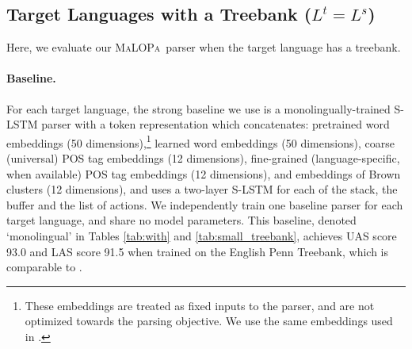 \documentclass[11pt]{article}
\newcommand{\malopa}{\textsc{MaLOPa}}
\begin{document}
\subsection{Target Languages with a Treebank ($L^t = L^s$)}
\label{sec:with}
Here, we evaluate our \malopa~parser when the target language has a treebank.

\paragraph{Baseline.} For each target language, the strong baseline we use is a monolingually-trained S-LSTM parser with a token representation which concatenates: pretrained word embeddings (50 dimensions),\footnote{These embeddings are treated as fixed inputs to the parser, and are not optimized towards the parsing objective. We use the same embeddings used in .} learned word embeddings (50 dimensions), coarse (universal) POS tag embeddings (12 dimensions), fine-grained (language-specific, when available) POS tag embeddings (12 dimensions), and embeddings of Brown clusters (12 dimensions), and uses a two-layer S-LSTM for each of the stack, the buffer and the list of actions.
We independently train one baseline parser for each target language, and share no model parameters.
This baseline, denoted `monolingual' in Tables \ref{tab:with} and \ref{tab:small_treebank}, achieves UAS score 93.0 and LAS score 91.5 when trained on the English Penn Treebank, which is comparable to .
\end{document}
